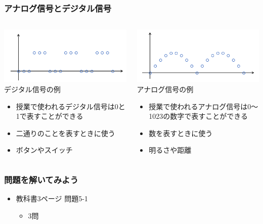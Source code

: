 \begin{frame}[fragile]
    \frametitle{アナログ信号とデジタル信号}
    \begin{columns}
        \begin{column}{0.48\textwidth}
            \includegraphics[width=\textwidth]{images/chap05/text05-img002.png} 
            {デジタル信号の例}
            \vspace{2pt}
            \begin{itemize}
                \item 授業で使われるデジタル信号は0と1で表すことができる
                \item 二通りのことを表すときに使う
                \item ボタンやスイッチ
            \end{itemize}
        \end{column}
        \begin{column}{0.48\textwidth}
            \includegraphics[width=\textwidth]{images/chap05/text05-img003.png} 
            {アナログ信号の例}
            \vspace{2pt}
            \begin{itemize}
                \item 授業で使われるアナログ信号は0〜1023の数字で表すことができる
                \item 数を表すときに使う
                \item 明るさや距離
            \end{itemize}
        \end{column}
    \end{columns}
\end{frame}

\begin{frame}[fragile]
    \frametitle{問題を解いてみよう}
    \begin{itemize}
        \item 教科書3ページ 問題5-1
        \begin{itemize}
            \item 3問
        \end{itemize}
    \end{itemize}
\end{frame}
